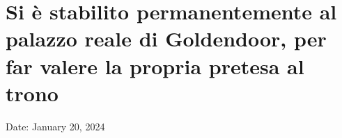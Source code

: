 \section{Si è stabilito permanentemente al palazzo reale di Goldendoor,
per far valere la propria pretesa al
trono}\label{si-uxe8-stabilito-permanentemente-al-palazzo-reale-di-goldendoor-per-far-valere-la-propria-pretesa-al-trono}

Date: January 20, 2024
